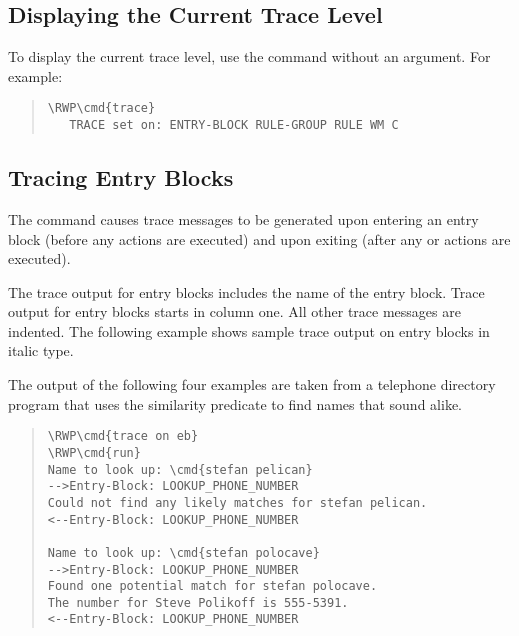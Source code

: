 \subsection{Displaying the Current Trace Level}

To display the current trace level, use the  command without
an argument. For example:

\begin{quote}
\begin{Verbatim}[commandchars=\\\{\}]
\RWP\cmd{trace}
   TRACE set on: ENTRY-BLOCK RULE-GROUP RULE WM C
\end{Verbatim}
\end{quote}

\subsection{Tracing Entry Blocks}

The  command causes trace messages to be generated
upon entering an entry block (before any  actions are
executed) and upon exiting (after any  or 
actions are executed).

The trace output for entry blocks includes the name of the entry
block. Trace output for entry blocks starts in column one. All
other trace messages are indented. The following example shows
sample trace output on entry blocks in italic type.

\begin{note}
  The output of the following four examples are taken from a telephone
  directory program that uses the similarity predicate to find names
  that sound alike.
\end{note}

\begin{quote}
\begin{Verbatim}[commandchars=\\\{\}]
\RWP\cmd{trace on eb}
\RWP\cmd{run}
Name to look up: \cmd{stefan pelican}
-->Entry-Block: LOOKUP_PHONE_NUMBER
Could not find any likely matches for stefan pelican.
<--Entry-Block: LOOKUP_PHONE_NUMBER

Name to look up: \cmd{stefan polocave}
-->Entry-Block: LOOKUP_PHONE_NUMBER
Found one potential match for stefan polocave.
The number for Steve Polikoff is 555-5391.
<--Entry-Block: LOOKUP_PHONE_NUMBER
\end{Verbatim}
\end{quote}

